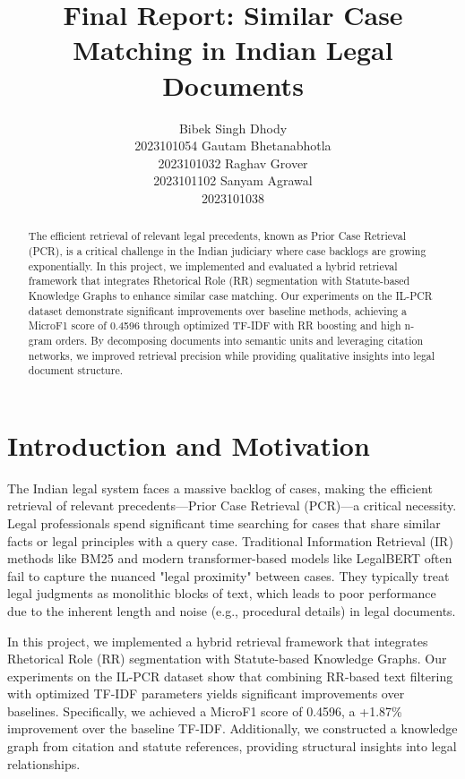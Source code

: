 \documentclass[11pt]{article}
\title{Final Report: Similar Case Matching in Indian Legal Documents}
\author{
  Bibek Singh Dhody \\ 2023101054 \And
  Gautam Bhetanabhotla \\ 2023101032 \And
  Raghav Grover \\ 2023101102 \And
  Sanyam Agrawal \\ 2023101038
}
\begin{document}
\maketitle

\begin{abstract}
The efficient retrieval of relevant legal precedents, known as Prior Case Retrieval (PCR), is a critical challenge in the Indian judiciary where case backlogs are growing exponentially. In this project, we implemented and evaluated a hybrid retrieval framework that integrates Rhetorical Role (RR) segmentation with Statute-based Knowledge Graphs to enhance similar case matching. Our experiments on the IL-PCR dataset demonstrate significant improvements over baseline methods, achieving a MicroF1 score of 0.4596 through optimized TF-IDF with RR boosting and high n-gram orders. By decomposing documents into semantic units and leveraging citation networks, we improved retrieval precision while providing qualitative insights into legal document structure.
\end{abstract}

\section{Introduction and Motivation}

The Indian legal system faces a massive backlog of cases, making the efficient retrieval of relevant precedents---Prior Case Retrieval (PCR)---a critical necessity. Legal professionals spend significant time searching for cases that share similar facts or legal principles with a query case. Traditional Information Retrieval (IR) methods like BM25 and modern transformer-based models like LegalBERT often fail to capture the nuanced "legal proximity" between cases. They typically treat legal judgments as monolithic blocks of text, which leads to poor performance due to the inherent length and noise (e.g., procedural details) in legal documents.

In this project, we implemented a hybrid retrieval framework that integrates Rhetorical Role (RR) segmentation with Statute-based Knowledge Graphs. Our experiments on the IL-PCR dataset show that combining RR-based text filtering with optimized TF-IDF parameters yields significant improvements over baselines. Specifically, we achieved a MicroF1 score of 0.4596, a +1.87\% improvement over the baseline TF-IDF. Additionally, we constructed a knowledge graph from citation and statute references, providing structural insights into legal relationships.
\end{document}
